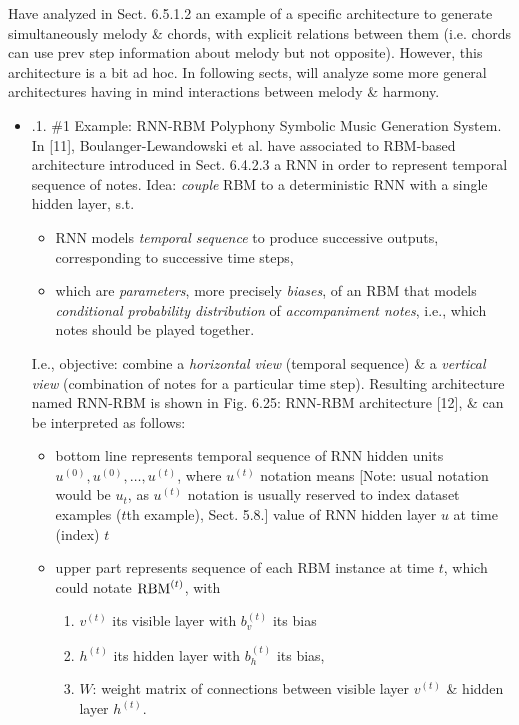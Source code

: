 \documentclass{article}
\begin{document}
\begin{itemize}
\begin{itemize}
		Have analyzed in Sect. 6.5.1.2 an example of a specific architecture to generate simultaneously melody \& chords, with explicit relations between them (i.e. chords can use prev step information about melody but not opposite). However, this architecture is a bit ad hoc. In following sects, will analyze some more general architectures having in mind interactions between melody \& harmony.
		\begin{itemize}
			\item {.1. \#1 Example: RNN-RBM Polyphony Symbolic Music Generation System.} In [11], {\sc Boulanger-Lewandowski} et al. have associated to RBM-based architecture introduced in Sect. 6.4.2.3 a RNN in order to represent temporal sequence of notes. Idea: {\it couple} RBM to a deterministic RNN with a single hidden layer, s.t.
			\begin{itemize}
				\item RNN models {\it temporal sequence} to produce successive outputs, corresponding to successive time steps,
				\item which are {\it parameters}, more precisely {\it biases}, of an RBM that models {\it conditional probability distribution} of {\it accompaniment notes}, i.e., which notes should be played together.
			\end{itemize}
			I.e., objective: combine a {\it horizontal view} (temporal sequence) \& a {\it vertical view} (combination of notes for a particular time step). Resulting architecture named RNN-RBM is shown in {\sf Fig. 6.25: RNN-RBM architecture [12]}, \& can be interpreted as follows:
			\begin{itemize}
				\item bottom line represents temporal sequence of RNN hidden units $u^{(0)},u^{(0)},\ldots,u^{(t)}$, where $u^{(t)}$ notation means [Note: usual notation would be $u_t$, as $u^{(t)}$ notation is usually reserved to index dataset examples ($t$th example), Sect. 5.8.] value of RNN hidden layer $u$ at time (index) $t$
				\item upper part represents sequence of each RBM instance at time $t$, which could notate ${\rm RBM}^{(t)}$, with
				\begin{enumerate}
					\item $v^{(t)}$ its visible layer with $b_v^{(t)}$ its bias
					\item $h^{(t)}$ its hidden layer with $b_h^{(t)}$ its bias,
					\item $W$: weight matrix of connections between visible layer $v^{(t)}$ \& hidden layer $h^{(t)}$.

\end{enumerate}
\end{itemize}
\end{itemize}
\end{itemize}
\end{itemize}
\end{document}
